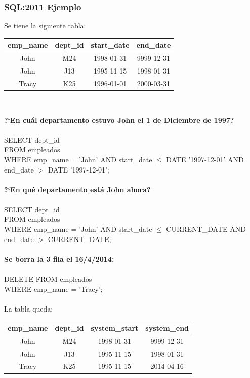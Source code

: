 \documentclass[a4paper,12pt,oneside]{report}
\begin{document}
\subsubsection*{SQL:2011 Ejemplo}
Se tiene la siguiente tabla:
\begin{center}
\begin{tabular}{|c|c|c|c|}
\hline
emp\_name & dept\_id & start\_date & end\_date\\
\hline
John & M24 & 1998-01-31 & 9999-12-31\\
\hline
John & J13 & 1995-11-15 & 1998-01-31\\
\hline
Tracy & K25 & 1996-01-01 & 2000-03-31\\
\hline
\end{tabular}\\
\end{center}
\textbf{?`En cu\'al departamento estuvo John el 1 de Diciembre de 1997?}\\
\ \\
SELECT dept\_id\\
FROM empleados\\
WHERE emp\_name = 'John' AND start\_date $\leq$ DATE '1997-12-01' AND end\_date $>$ DATE '1997-12-01';\\
\ \\
\textbf{?`En qu\'e departamento est\'a John ahora?}\\
\ \\
SELECT dept\_id\\
FROM empleados\\
WHERE emp\_name = 'John' AND start\_date $\leq$ CURRENT\_DATE AND end\_date $>$ CURRENT\_DATE;\\
\ \\
\textbf{Se borra la 3 fila el 16/4/2014:}\\
\ \\
DELETE FROM empleados\\
WHERE emp\_name = 'Tracy';\\
\ \\
La tabla queda:
\begin{center}
\begin{tabular}{|c|c|c|c|}
\hline
emp\_name & dept\_id & system\_start & system\_end\\
\hline
John & M24 & 1998-01-31 & 9999-12-31\\
\hline
John & J13 & 1995-11-15 & 1998-01-31\\
\hline
Tracy & K25 & 1995-11-15 & 2014-04-16\\
\hline
\end{tabular}
\end{center}
\end{document}

